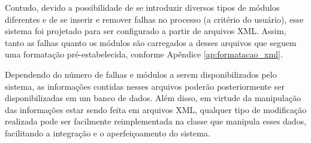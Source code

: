 
Contudo, devido a possibilidade de se introduzir diversos tipos de módulos
diferentes e de se inserir e remover falhas no processo (a critério do usuário),
esse sistema foi projetado para ser configurado a partir de arquivos XML. Assim,
tanto as falhas quanto os módulos são carregados a desses arquivos que
seguem uma formatação pré-estabelecida, conforme Apêndice
\ref{ap:formatacao_xml}.

Dependendo do número de falhas e módulos a serem disponibilizados pelo sistema,
as informações contidas nesses arquivos poderão posteriormente ser
disponibilizadas em um banco de dados. Além disso, em virtude da manipulação das
informações estar sendo feita em arquivos XML, qualquer tipo de modificação
realizada pode ser facilmente reimplementada na classe que manipula esses dados,
facilitando a integração e o aperfeiçoamento do sistema.
